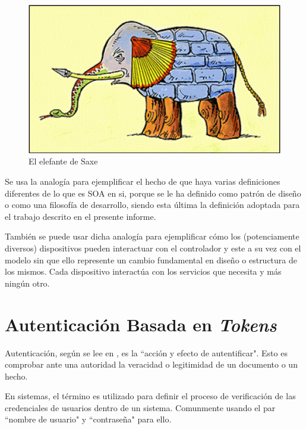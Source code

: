     \begin{figure}[htbp!]
        \begin{center}
            \includegraphics[width=.8\textwidth]{figures/Elefante}
        \end{center}
        \caption {El elefante de Saxe}
        \label{elefante-saxe}
    \end{figure}

    Se usa la analogía para ejemplificar el hecho de que haya varias definiciones diferentes de lo que es SOA en si, porque se le ha definido como patrón de diseño o como una filosofía de desarrollo, siendo esta última la definición adoptada para el trabajo descrito en el presente informe.
    
    También se puede usar dicha analogía para ejemplificar cómo los (potenciamente diversos) dispositivos pueden interactuar con el controlador y este a su vez con el modelo sin que ello represente un cambio fundamental en diseño o estructura de los mismos. Cada dispositivo interactúa con los servicios que necesita y más ningún otro.

    

    \section{Autenticación Basada en \textit{Tokens}}
    
    Autenticación, según se lee en \cite{AUTENTICACION-rae}, es la ``acción y efecto de autentificar". Esto es comprobar ante una autoridad la veracidad o legitimidad de un documento o un hecho\cite{AUTENTICACION-wordref}.
    
    En sistemas, el término es utilizado para definir el proceso de verificación de las credenciales de usuarios dentro de un sistema. Comunmente usando el par ``nombre de usuario" y ``contraseña" para ello.
    
